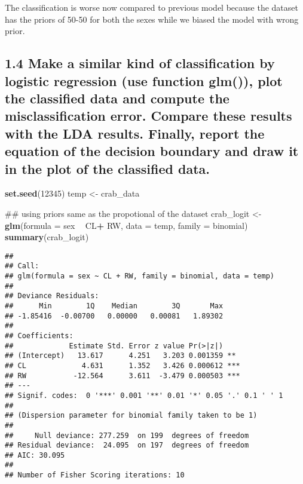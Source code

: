 \documentclass[]{article}
\newenvironment{Shaded}{\begin{snugshade}}{\end{snugshade}}
\newcommand{\KeywordTok}[1]{\textcolor[rgb]{0.13,0.29,0.53}{\textbf{#1}}}
\newcommand{\DataTypeTok}[1]{\textcolor[rgb]{0.13,0.29,0.53}{#1}}
\newcommand{\DecValTok}[1]{\textcolor[rgb]{0.00,0.00,0.81}{#1}}
\newcommand{\StringTok}[1]{\textcolor[rgb]{0.31,0.60,0.02}{#1}}
\newcommand{\OperatorTok}[1]{\textcolor[rgb]{0.81,0.36,0.00}{\textbf{#1}}}
\newcommand{\NormalTok}[1]{#1}
\begin{document}
The classification is worse now compared to previous model because the
dataset has the priors of 50-50 for both the sexes while we biased the
model with wrong prior.

\subsection{1.4 Make a similar kind of classification by logistic
regression (use function glm()), plot the classified data and compute
the misclassification error. Compare these results with the LDA results.
Finally, report the equation of the decision boundary and draw it in the
plot of the classified
data.}\label{make-a-similar-kind-of-classification-by-logistic-regression-use-function-glm-plot-the-classified-data-and-compute-the-misclassification-error.-compare-these-results-with-the-lda-results.-finally-report-the-equation-of-the-decision-boundary-and-draw-it-in-the-plot-of-the-classified-data.}

\begin{Shaded}
\begin{Highlighting}[]
\KeywordTok{set.seed}\NormalTok{(}\DecValTok{12345}\NormalTok{)}
\NormalTok{temp <-}\StringTok{ }\NormalTok{crab_data}

\NormalTok{## using priors same as the propotional of the dataset}
\NormalTok{crab_logit <-}\StringTok{ }\KeywordTok{glm}\NormalTok{(}\DataTypeTok{formula =}\NormalTok{ sex }\OperatorTok{~}\StringTok{ }\NormalTok{CL}\OperatorTok{+}\StringTok{ }\NormalTok{RW, }\DataTypeTok{data =}\NormalTok{ temp, }\DataTypeTok{family =}\NormalTok{ binomial)}
\KeywordTok{summary}\NormalTok{(crab_logit)}
\end{Highlighting}
\end{Shaded}

\begin{verbatim}
## 
## Call:
## glm(formula = sex ~ CL + RW, family = binomial, data = temp)
## 
## Deviance Residuals: 
##      Min        1Q    Median        3Q       Max  
## -1.85416  -0.00700   0.00000   0.00081   1.89302  
## 
## Coefficients:
##             Estimate Std. Error z value Pr(>|z|)    
## (Intercept)   13.617      4.251   3.203 0.001359 ** 
## CL             4.631      1.352   3.426 0.000612 ***
## RW           -12.564      3.611  -3.479 0.000503 ***
## ---
## Signif. codes:  0 '***' 0.001 '**' 0.01 '*' 0.05 '.' 0.1 ' ' 1
## 
## (Dispersion parameter for binomial family taken to be 1)
## 
##     Null deviance: 277.259  on 199  degrees of freedom
## Residual deviance:  24.095  on 197  degrees of freedom
## AIC: 30.095
## 
## Number of Fisher Scoring iterations: 10
\end{verbatim}
\end{document}
